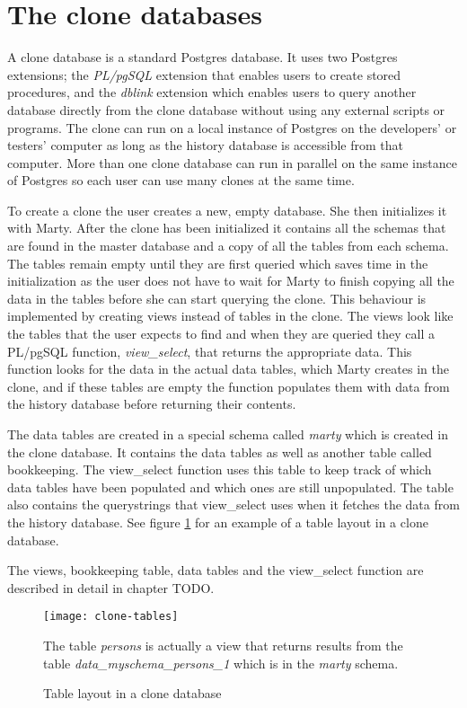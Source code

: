 \section{The clone databases}
\label{sec:clones}
A clone database is a standard Postgres database.
It uses two Postgres extensions; the \textit{PL/pgSQL} extension that enables users to create stored procedures, and the \textit{dblink} extension which enables users to query another database directly from the clone database without using any external scripts or programs.
The clone can run on a local instance of Postgres on the developers' or testers' computer as long as the history database is accessible from that computer.
More than one clone database can run in parallel on the same instance of Postgres so each user can use many clones at the same time.

To create a clone the user creates a new, empty database.
She then initializes it with Marty.
After the clone has been initialized it contains all the schemas that are found in the master database and a copy of all the tables from each schema.
The tables remain empty until they are first queried which saves time in the initialization as the user does not have to wait for Marty to finish copying all the data in the tables before she can start querying the clone.
This behaviour is implemented by creating views instead of tables in the clone.
The views look like the tables that the user expects to find and when they are queried they call a PL/pgSQL function, \textit{view\_select}, that returns the appropriate data.
This function looks for the data in the actual data tables, which Marty creates in the clone, and if these tables are empty the function populates them with data from the history database before returning their contents.

The data tables are created in a special schema called \textit{marty} which is created in the clone database.
It contains the data tables as well as another table called bookkeeping.
The view\_select function uses this table to keep track of which data tables have been populated and which ones are still unpopulated.
The table also contains the querystrings that view\_select uses when it fetches the data from the history database.
See figure \ref{clone-tables} for an example of a table layout in a clone database.

The views, bookkeeping table, data tables and the view\_select function are described in detail in chapter TODO.

\begin{figure}[h!]
  \centering
    \texttt{[image: clone-tables]}
  \caption{Table layout in a clone database}
  \medskip
  \small
  The table \textit{persons} is actually a view that returns results from the table \textit{data\_myschema\_persons\_1} which is in the \textit{marty} schema.
  \label{clone-tables}
\end{figure}

